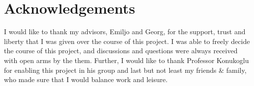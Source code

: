 %


\newpage

\chapter*{Acknowledgements}
I would like to thank my advisors, Emiljo and Georg, for the support, trust and liberty that I was given over the course of this project. I was able to freely decide the course of this project, and discussions and questions were always received with open arms by the them. Further, I would like to thank Professor Konukoglu for enabling this project in his group and last but not least my friends \& family, who made sure that I would balance work and leisure.